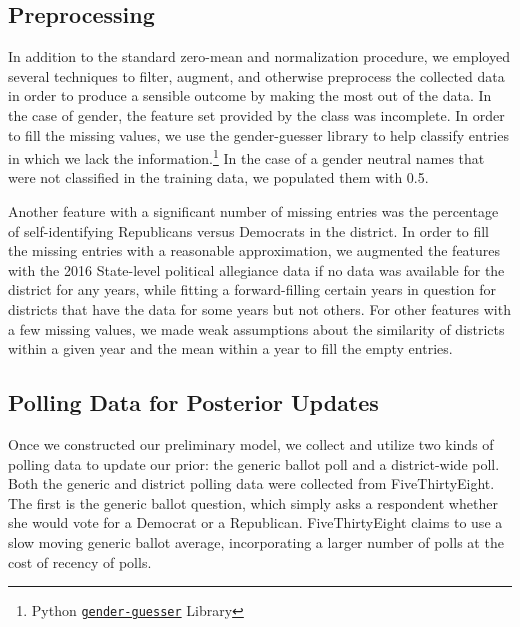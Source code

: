 \documentclass[12pt, letterpaper]{article}
\begin{document}
\subsection{Preprocessing}

In addition to the standard zero-mean and normalization procedure, we employed several techniques to filter, augment, and otherwise preprocess the collected data in order to produce a sensible outcome by making the most out of the data. In the case of gender, the feature set provided by the class was incomplete. In order to fill the missing values, we use the gender-guesser library to help classify entries in which we lack the information.\footnote{Python \href{https://pypi.org/project/gender-guesser/}{\texttt{gender-guesser}} Library} In the case of a gender neutral names that were not classified in the training data, we populated them with 0.5.

Another feature with a significant number of missing entries was the percentage of self-identifying Republicans versus Democrats in the district. In order to fill the missing entries with a reasonable approximation, we augmented the features with the 2016 State-level political allegiance data if no data was available for the district for any years, while fitting a forward-filling certain years in question for districts that have the data for some years but not others. For other features with a few missing values, we made weak assumptions about the similarity of districts within a given year and the mean within a year to fill the empty entries. 

\subsection{Polling Data for Posterior Updates}
Once we constructed our preliminary model, we collect and utilize two kinds of polling data to update our prior: the generic ballot poll and a district-wide poll. Both the generic and district polling data were collected from FiveThirtyEight. The first is the generic ballot question, which simply asks a respondent whether she would vote for a Democrat or a Republican. FiveThirtyEight claims to use a slow moving generic ballot average, incorporating a larger number of polls at the cost of recency of polls.
\end{document}
